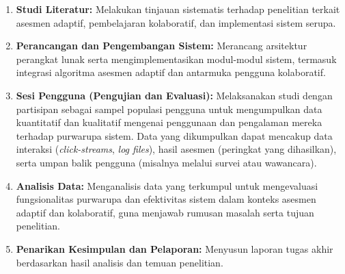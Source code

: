 \begin{enumerate}
    \item \textbf{Studi Literatur:} Melakukan tinjauan sistematis terhadap penelitian terkait asesmen adaptif, pembelajaran kolaboratif, dan implementasi sistem serupa.
    
    \item \textbf{Perancangan dan Pengembangan Sistem:} Merancang arsitektur perangkat lunak serta mengimplementasikan modul-modul sistem, termasuk integrasi algoritma asesmen adaptif dan antarmuka pengguna kolaboratif.
    
    \item \textbf{Sesi Pengguna (Pengujian dan Evaluasi):} Melaksanakan studi dengan partisipan sebagai sampel populasi pengguna untuk mengumpulkan data kuantitatif dan kualitatif mengenai penggunaan dan pengalaman mereka terhadap purwarupa sistem. Data yang dikumpulkan dapat mencakup data interaksi (\textit{click-streams}, \textit{log files}), hasil asesmen (peringkat yang dihasilkan), serta umpan balik pengguna (misalnya melalui survei atau wawancara).
    
    \item \textbf{Analisis Data:} Menganalisis data yang terkumpul untuk mengevaluasi fungsionalitas purwarupa dan efektivitas sistem dalam konteks asesmen adaptif dan kolaboratif, guna menjawab rumusan masalah serta tujuan penelitian.
    
    \item \textbf{Penarikan Kesimpulan dan Pelaporan:} Menyusun laporan tugas akhir berdasarkan hasil analisis dan temuan penelitian.
\end{enumerate}

